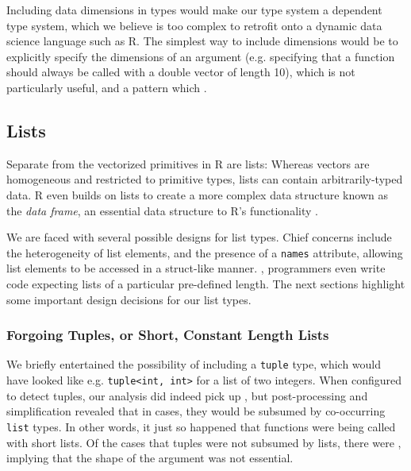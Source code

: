 \documentclass[acmsmall,review,anonymous]{acmart}\settopmatter{printfolios=true,printccs=false,printacmref=false}
\newcommand{\code}[1]{{\lstinline[style=Rin]!#1!}\xspace}
\begin{document}
Including data dimensions in types would make our type system a dependent type system, which we believe is too complex to retrofit onto a dynamic data science language such as R.
The simplest way to include dimensions would be to explicitly specify the dimensions of an argument (e.g. specifying that a function should always be called with a double vector of length 10), which is not particularly useful, and a pattern which .



%
%
%
%
\subsection{Lists}

Separate from the vectorized primitives in R are lists:
Whereas vectors are homogeneous and restricted to primitive types, lists can contain arbitrarily-typed data.
R even builds on lists to create a more complex data structure known as the {\it data frame}, an essential data structure to R's functionality .

We are faced with several possible designs for list types.
Chief concerns include the heterogeneity of list elements, and the presence of a \code{names} attribute, allowing list elements to be accessed in a struct-like manner.
, programmers even write code expecting lists of a particular pre-defined length.
The next sections highlight some important design decisions for our list types.


%
%
\subsubsection{Forgoing Tuples, or Short, Constant Length Lists}

We briefly entertained the possibility of including a \code{tuple} type, which would have looked like e.g. \code{tuple<int, int>} for a list of two integers.
When configured to detect tuples, our analysis did indeed pick up , but post-processing and simplification revealed that in  cases, they would be subsumed by co-occurring \code{list} types.
In other words, it just so happened that functions were being called with short lists.
Of the cases that tuples were not subsumed by lists,  there were , implying that the shape of the argument was not essential.
\end{document}
